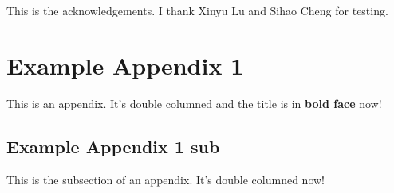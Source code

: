 \documentclass[times, twocolumn]{aastex63}
\begin{document}
\begin{CJK*}{UTF8}{gbsn}
\facilities{}

\software{}

\acknowledgments
This is the acknowledgements. I thank Xinyu Lu and Sihao Cheng for testing.


\appendix
\section{Example Appendix 1}\label{append-a}

This is an appendix. It's double columned and the title is in \textbf{bold face} now!

\subsection{Example Appendix 1 sub}\label{append-a-1}
This is the subsection of an appendix. It's double columned now!


\end{CJK*}
\end{document}

